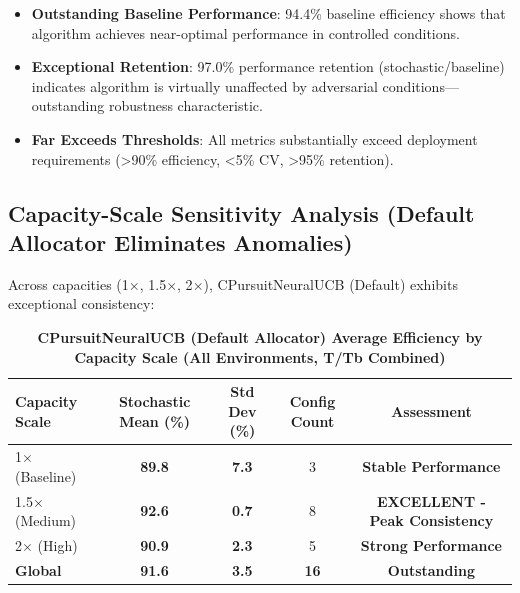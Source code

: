 \documentclass[12pt,a4paper]{article}
\newcommand{\success}[1]{\textcolor{successcolor}{\textbf{#1}}}
\begin{document}
\begin{tcolorbox}[colback=stochasticcolor!10,colframe=stochasticcolor,title=\textbf{Stochastic Environment Analysis (CPursuitNeuralUCB Default Allocator, 1$\times$–2$\times$ Capacities, T/Tb Combined)}]
\begin{itemize}
\item \success{Outstanding Baseline Performance}: 94.4\% baseline efficiency shows that algorithm achieves near-optimal performance in controlled conditions.

\item \success{Exceptional Retention}: 97.0\% performance retention (stochastic/baseline) indicates algorithm is virtually unaffected by adversarial conditions—outstanding robustness characteristic.

\item \success{Far Exceeds Thresholds}: All metrics substantially exceed deployment requirements (>90\% efficiency, <5\% CV, >95\% retention).
\end{itemize}

\end{tcolorbox}

\subsection{Capacity-Scale Sensitivity Analysis (Default Allocator Eliminates Anomalies)}

Across capacities (1$\times$, 1.5$\times$, 2$\times$), CPursuitNeuralUCB (Default) exhibits exceptional consistency:

\begin{table}[H]
\centering
\caption{\success{CPursuitNeuralUCB (Default Allocator) Average Efficiency by Capacity Scale (All Environments, T/Tb Combined)}}
\begin{tabular}{|l|c|c|c|c|}
\hline
\textbf{Capacity Scale} & \textbf{Stochastic Mean (\%)} & \textbf{Std Dev (\%)} & \textbf{Config Count} & \textbf{Assessment} \\
\hline
1$\times$ (Baseline) & \success{89.8} & \success{7.3} & 3 & \success{Stable Performance} \\
1.5$\times$ (Medium) & \success{92.6} & \success{0.7} & 8 & \success{EXCELLENT - Peak Consistency} \\
2$\times$ (High) & \success{90.9} & \success{2.3} & 5 & \success{Strong Performance} \\
\hline
\textbf{Global} & \textbf{\success{91.6}} & \textbf{\success{3.5}} & \textbf{16} & \textbf{\success{Outstanding}} \\
\hline
\end{tabular}
\end{table}
\end{document}
